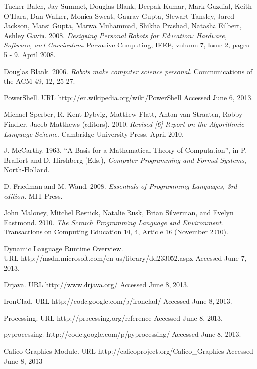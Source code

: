 \documentclass[preprint]{sigplanconf}
\begin{document}
\begin{thebibliography}{}
 Tucker Balch, Jay Summet, Douglas Blank, Deepak Kumar,
  Mark Guzdial, Keith O'Hara, Dan Walker, Monica Sweat, Gaurav Gupta,
  Stewart Tansley, Jared Jackson, Mansi Gupta, Marwa Muhammad, Shikha
  Prashad, Natasha Eilbert, Ashley Gavin. 2008. \textit{Designing
    Personal Robots for Education: Hardware, Software, and
    Curriculum}. Pervasive Computing, IEEE, volume 7, Issue 2, pages 5
  - 9. April 2008.

 Douglas Blank. 2006. \textit{Robots make computer science
  personal}. Communications of the ACM 49, 12, 25-27.

 PowerShell. URL http://en.wikipedia.org/wiki/PowerShell Accessed June 6, 2013.

 Michael Sperber, R. Kent Dybvig, Matthew
  Flatt, Anton van Straaten, Robby Findler, Jacob Matthews
  (editors). 2010. \textit{Revised [6] Report on the Algorithmic Language
  Scheme}. Cambridge University Press. April 2010.

 J. McCarthy, 1963. ``A Basis for a Mathematical Theory
  of Computation'', in P. Braffort and D. Hirshberg (Eds.),
  \emph{Computer Programming and Formal Systems}, North-Holland.

 D. Friedman and M. Wand, 2008. \emph{Essentials of
  Programming Languages, 3rd edition}. MIT Press.

 John Maloney, Mitchel Resnick, Natalie Rusk, Brian
  Silverman, and Evelyn Eastmond. 2010. \textit{The Scratch Programming
  Language and Environment}. Transactions on Computing Education 10, 4,
  Article 16 (November 2010).

 Dynamic Language Runtime Overview. \\ URL
  http://msdn.microsoft.com/en-us/library/dd233052.aspx Accessed June
  7, 2013.

 Drjava. URL http://www.drjava.org/ Accessed June 8, 2013.

 IronClad. URL http://code.google.com/p/ironclad/
  Accessed June 8, 2013.

 Processing. URL http://processing.org/reference
  Accessed June 8, 2013.

  pyprocessing. http://code.google.com/p/pyprocessing/ Accessed June
  8, 2013.

 Calico Graphics Module. URL http://calicoproject.org/Calico\_Graphics Accessed June 8,
  2013.

\end{thebibliography}
\end{document}
